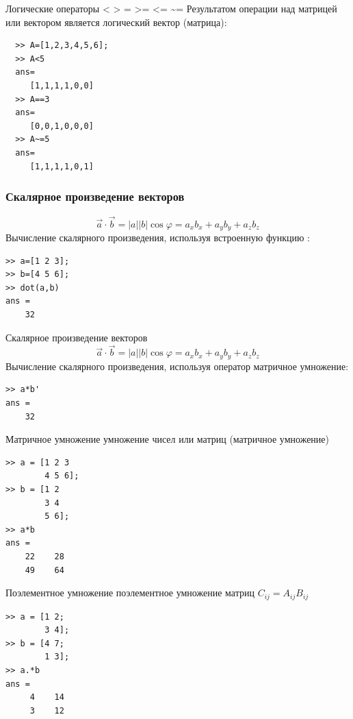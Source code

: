 \documentclass[11pt, compress]{beamer}
\begin{document}
\begin{frame}[fragile]{Логические операторы < > = >= <= \textasciitilde =}  
  Результатом операции над матрицей или вектором является логический вектор (матрица):
  \begin{lstlisting}  
  >> A=[1,2,3,4,5,6];
  >> A<5  
  ans=
     [1,1,1,1,0,0]
  >> A==3
  ans=
     [0,0,1,0,0,0]
  >> A~=5   
  ans=
     [1,1,1,1,0,1]
  \end{lstlisting}   
\end{frame}

\begin{frame}[fragile]
\frametitle{Скалярное произведение векторов}
$$
\vec a \cdot \vec b = |a||b|\cos \varphi = a_x b_x + a_y b_y + a_z b_z
$$
Вычисление скалярного произведения, используя встроенную функцию :

\begin{lstlisting}[frame=single]
>> a=[1 2 3];
>> b=[4 5 6]; 
>> dot(a,b) 
ans =  
    32   
\end{lstlisting} 

\end{frame}

\begin{frame}[fragile]{Скалярное произведение векторов}
$$
\vec a \cdot \vec b = |a||b|\cos \varphi = a_x b_x + a_y b_y + a_z b_z
$$
Вычисление скалярного произведения, используя оператор матричное умножение:
\begin{lstlisting}[frame=single]
>> a*b'
ans =
    32 
\end{lstlisting}
\end{frame}

\begin{frame}[fragile]{Матричное умножение}
 умножение чисел или матриц (матричное умножение) 
\begin{lstlisting}
>> a = [1 2 3
        4 5 6];
>> b = [1 2
        3 4 
        5 6]; 
>> a*b
ans =
    22    28
    49    64
\end{lstlisting}   
\end{frame}

\begin{frame}[fragile]{Поэлементное умножение}
 поэлементное умножение матриц $C_{ij}=A_{ij} B_{ij}$ 
\begin{lstlisting}
>> a = [1 2; 
        3 4];
>> b = [4 7;
        1 3];
>> a.*b
ans =
     4    14
     3    12  
\end{lstlisting}
\end{frame}
\end{document}
